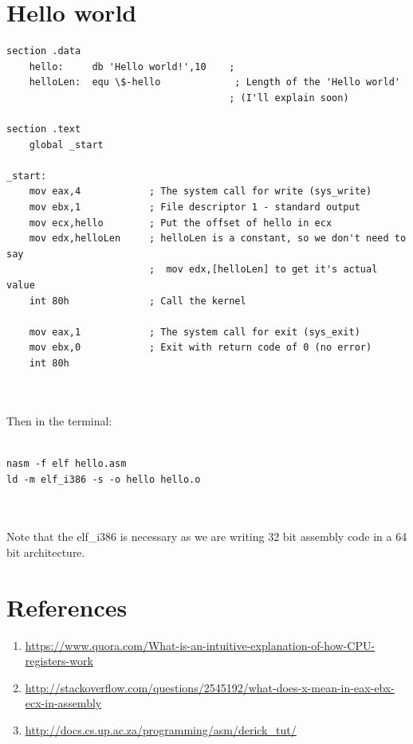 \documentclass[10pt,a4paper]{book}
\begin{document}
\section{Hello world}
\begin{verbatim}
section .data
	hello:     db 'Hello world!',10    ; 
	helloLen:  equ \$-hello             ; Length of the 'Hello world'
	                                   ; (I'll explain soon)

section .text
	global _start

_start:
	mov eax,4            ; The system call for write (sys_write)
	mov ebx,1            ; File descriptor 1 - standard output
	mov ecx,hello        ; Put the offset of hello in ecx
	mov edx,helloLen     ; helloLen is a constant, so we don't need to say
	                     ;  mov edx,[helloLen] to get it's actual value
	int 80h              ; Call the kernel

	mov eax,1            ; The system call for exit (sys_exit)
	mov ebx,0            ; Exit with return code of 0 (no error)
	int 80h
\end{verbatim}
\\\\
Then in the terminal:\\\\
\begin{verbatim}
nasm -f elf hello.asm
ld -m elf_i386 -s -o hello hello.o
\end{verbatim}
\\\\
Note that the elf\_i386 is necessary as we are writing 32 bit assembly code in a 64 bit architecture.
\newpage
\section{References}
\begin{enumerate}
\item \url{https://www.quora.com/What-is-an-intuitive-explanation-of-how-CPU-registers-work}
\item \url{http://stackoverflow.com/questions/2545192/what-does-x-mean-in-eax-ebx-ecx-in-assembly}
\item \url{http://docs.cs.up.ac.za/programming/asm/derick_tut/}
\end{enumerate}
\end{document}

